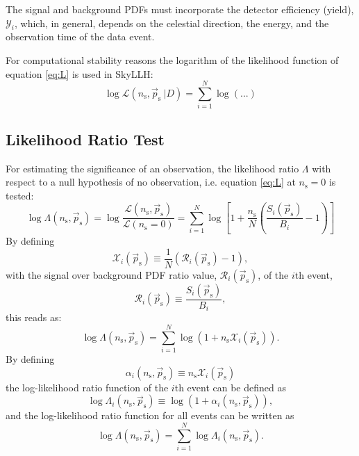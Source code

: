 \documentclass{article}
\newcommand{\ns}{n_{\mathrm{s}}}
\newcommand{\ps}{\vec{p}_{\mathrm{s}}}
\begin{document}
The signal and background PDFs must incorporate the detector efficiency (yield),
$\mathcal{Y}_i$, which, in general, depends on the celestial direction, the
energy, and the observation time of the data event.

For computational stability reasons the logarithm of the likelihood function of
equation \ref{eq:L} is used in SkyLLH:
\begin{equation}
 \log \mathcal{L}(\ns,\ps~|D) = \sum_{i=1}^{N} \log (...)
\end{equation}

\subsection{Likelihood Ratio Test}

For estimating the significance of an observation, the likelihood ratio
$\Lambda$ with respect to a null hypothesis of no observation, i.e.
equation \ref{eq:L} at $\ns=0$ is tested:
\begin{equation}
 \log \Lambda(\ns,\ps) = \log \frac{\mathcal{L}(\ns,\ps)}{\mathcal{L}(\ns=0)} = \sum_{i=1}^{N} \log \left[ 1 + \frac{\ns}{N}\left( \frac{S_i(\ps)}{B_i} - 1 \right) \right]
\label{eq:logLambda}
\end{equation}
By defining
\begin{equation}
\mathcal{X}_i(\ps) \equiv \frac{1}{N}\left( \mathcal{R}_i(\ps) - 1 \right),
\label{eq:Xi}
\end{equation}
with the signal over background PDF ratio value, $\mathcal{R}_{i}(\ps)$, of the
$i$th event,
\begin{equation}
 \mathcal{R}_i(\ps) \equiv \frac{S_i(\ps)}{B_i},
\end{equation}
this reads as:
\begin{equation}
 \log \Lambda(\ns,\ps) = \sum_{i=1}^{N} \log (1 + \ns\mathcal{X}_i(\ps)).
 \label{eq:logLambdaOfX}
\end{equation}
By defining
\begin{equation}
 \alpha_i(\ns,\ps) \equiv \ns \mathcal{X}_i(\ps)
\end{equation}
the log-likelihood ratio function of the $i$th event can be defined as
\begin{equation}
 \log \Lambda_i(\ns,\ps) \equiv \log(1 + \alpha_i(\ns, \ps)),
 \label{eq:logLambdaiOfalphai}
\end{equation}
and the log-likelihood ratio function for all events can be written as
\begin{equation}
 \log \Lambda(\ns,\ps) = \sum_{i=1}^{N} \log \Lambda_i(\ns,\ps).
 \label{eq:logLambdaOflogLambdai}
\end{equation}
\end{document}
